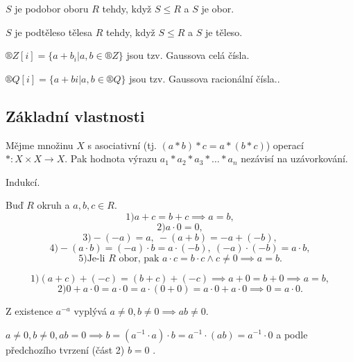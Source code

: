 \documentclass[12pt]{article}                   %
\begin{document}

    \begin{definice}[Podobor]
        $S$ je podobor oboru $R$ tehdy, když $S ≤ R$ a $S$ je obor.
    \end{definice}

    \begin{definice}[Podtěleso]
        $S$ je podtěleso tělesa $R$ tehdy, když $S ≤ R$ a $S$ je těleso.
    \end{definice}

    \begin{definice}
        $®Z[i] = \{a+b_i | a, b \in ®Z\}$ jsou tzv. Gaussova celá čísla.
    
        $®Q[i] = \{a+bi | a, b \in ®Q\}$ jsou tzv. Gaussova racionální čísla..
    \end{definice}

    \subsection{Základní vlastnosti}
        \begin{tvrzeni}
            Mějme množinu $X$ s asociativní (tj. $(a*b)*c = a*(b*c)$) operací $*:X \times X \rightarrow X$. Pak hodnota výrazu $a_1*a_2*a_3*…*a_n$ nezávisí na uzávorkování.

            \begin{dukazin}
                Indukcí.
            \end{dukazin}
        \end{tvrzeni}

        \begin{tvrzeni}
            Buď $R$ okruh a $a, b, c \in R$.
            $$ 1) a + c = b + c \implies a = b, $$
            $$ 2) a·0 = 0, $$
            $$ 3) -(-a) = a,\ -(a + b) = -a + (-b), $$
            $$ 4) -(a·b) = (-a)·b = a·(-b),\  (-a)·(-b) = a·b, $$ 
            $$ 5) \text{Je-li $R$ obor, pak } a·c = b·c \land c≠0 \implies a=b. $$ 

            \begin{dukazin}
                $$ 1) (a+c) + (-c) = (b + c) + (-c) \implies a+0 = b+0 \implies a = b, $$
                $$ 2) 0 + a·0 = a·0 = a·(0 + 0) = a·0 + a·0 \implies 0 = a·0. $$
            \end{dukazin}
        \end{tvrzeni}

        \begin{tvrzeni}
            Z existence $a^{-a}$ vyplývá $a≠0, b≠0 \implies ab ≠ 0$.

            \begin{dukazin}[Sporem]
                $a ≠ 0, b ≠ 0, ab=0 \implies b = (a^{-1}·a)·b = a^{-1}·(ab) = a^{-1}·0$ a podle předchozího tvrzení (část 2) $b = 0$ \lightning.
            \end{dukazin}
        \end{tvrzeni}
\end{document}
